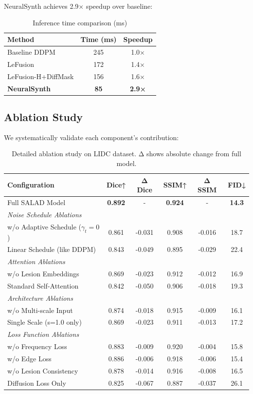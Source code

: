 \documentclass[10pt,twocolumn,letterpaper]{article}
\begin{document}
NeuralSynth achieves 2.9× speedup over baseline:

\begin{table}[h]
\centering
\caption{Inference time comparison (ms)}
\label{tab:speed}
\small
\begin{tabular}{lcc}
\toprule
Method & Time (ms) & Speedup \\
\midrule
Baseline DDPM & 245 & 1.0× \\
LeFusion & 172 & 1.4× \\
LeFusion-H+DiffMask & 156 & 1.6× \\
\textbf{NeuralSynth} & \textbf{85} & \textbf{2.9×} \\
\bottomrule
\end{tabular}
\end{table}

\subsection{Ablation Study}

We systematically validate each component's contribution:

\begin{table}[h]
\centering
\caption{Detailed ablation study on LIDC dataset. Δ shows absolute change from full model.}
\label{tab:ablation}
\small
\begin{tabular}{lccccc}
\toprule
Configuration & Dice↑ & Δ Dice & SSIM↑ & Δ SSIM & FID↓ \\
\midrule
Full SALAD Model & \textbf{0.892} & - & \textbf{0.924} & - & \textbf{14.3} \\
\midrule
\multicolumn{6}{l}{\textit{Noise Schedule Ablations}} \\
w/o Adaptive Schedule ($\gamma_t = 0$) & 0.861 & -0.031 & 0.908 & -0.016 & 18.7 \\
Linear Schedule (like DDPM) & 0.843 & -0.049 & 0.895 & -0.029 & 22.4 \\
\midrule
\multicolumn{6}{l}{\textit{Attention Ablations}} \\
w/o Lesion Embeddings & 0.869 & -0.023 & 0.912 & -0.012 & 16.9 \\
Standard Self-Attention & 0.842 & -0.050 & 0.906 & -0.018 & 19.3 \\
\midrule
\multicolumn{6}{l}{\textit{Architecture Ablations}} \\
w/o Multi-scale Input & 0.874 & -0.018 & 0.915 & -0.009 & 16.1 \\
Single Scale (s=1.0 only) & 0.869 & -0.023 & 0.911 & -0.013 & 17.2 \\
\midrule
\multicolumn{6}{l}{\textit{Loss Function Ablations}} \\
w/o Frequency Loss & 0.883 & -0.009 & 0.920 & -0.004 & 15.8 \\
w/o Edge Loss & 0.886 & -0.006 & 0.918 & -0.006 & 15.4 \\
w/o Lesion Consistency & 0.878 & -0.014 & 0.916 & -0.008 & 16.5 \\
Diffusion Loss Only & 0.825 & -0.067 & 0.887 & -0.037 & 26.1 \\
\bottomrule
\end{tabular}
\end{table}
\end{document}
